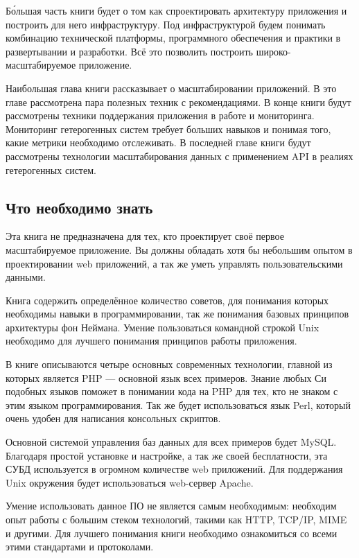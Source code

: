 Б\'{о}льшая часть книги будет о том как спроектировать архитектуру приложения и построить для него инфраструктуру. Под инфраструктурой будем понимать  комбинацию технической платформы, программного обеспечения и практики в развертывании и разработки. Всё это позволить построить широко-масштабируемое приложение.

Наибольшая глава книги рассказывает о масштабировании приложений.  В это главе рассмотрена пара полезных техник с рекомендациями. В конце книги будут рассмотрены техники поддержания приложения в работе и мониторинга. Мониторинг гетерогенных систем требует больших навыков и понимая того, какие метрики необходимо отслеживать. В последней главе книги будут рассмотрены  технологии масштабирования данных с применением API в реалиях гетерогенных систем.

\subsection{Что необходимо знать} \label{subsect1_1_3}

Эта книга не предназначена для тех, кто проектирует своё первое масштабируемое приложение. Вы должны обладать хотя бы небольшим опытом в проектировании web приложений, а так же уметь управлять пользовательскими данными.


Книга содержить определённое количество советов, для понимания которых необходимы навыки в программировании, так же понимания базовых принципов архитектуры фон Неймана. Умение пользоваться командной строкой Unix необходимо для лучшего понимания принципов работы приложения. 

В книге описываются четыре основных современных технологии, главной из которых является PHP --- основной язык всех примеров. Знание любых Си подобных языков поможет в понимании кода на PHP для тех, кто не знаком с этим языком программирования. Так же будет использоваться язык Perl, который очень удобен для написания  консольных скриптов.


Основной системой управления баз данных для всех примеров будет MySQL. Благодаря простой установке и настройке, а так же своей бесплатности, эта СУБД используется в огромном количестве web приложений. Для поддержания Unix окружения будет использоваться web-сервер Apache.

Умение использовать данное ПО не является самым необходимым: необходим опыт работы с большим стеком технологий, такими как HTTP, TCP/IP, MIME и другими. Для лучшего понимания книги необходимо ознакомиться со всеми этими стандартами и протоколами.








\clearpage
